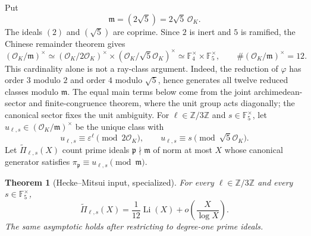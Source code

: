 \documentclass[12pt]{amsart}
\newtheorem{theorem}{Theorem}[section]
\theoremstyle{definition}
\theoremstyle{remark}
\newcommand{\ZZ}{\mathbb{Z}}
\newcommand{\FF}{\mathbb{F}}
\newcommand{\OK}{\mathcal{O}_K}
\newcommand{\eps}{\varepsilon}
\newcommand{\ph}{\varphi}
\begin{document}
Put
\[
  \mathfrak m=(2\sqrt5)=2\sqrt5\,\OK.
\]
The ideals $(2)$ and $(\sqrt5)$ are coprime.  Since $2$ is inert and
$5$ is ramified, the Chinese remainder theorem gives
\[
  (\OK/\mathfrak m)^\times
  \simeq (\OK/2\OK)^\times\times
         (\OK/\sqrt5\OK)^\times
  \simeq \FF_4^\times\times\FF_5^\times,
  \qquad
  \#(\OK/\mathfrak m)^\times=12.
\]
This cardinality alone is not a ray-class argument.  Indeed, the
reduction of $\ph$ has order $3$ modulo $2$ and order $4$ modulo
$\sqrt5$, hence generates all twelve reduced classes modulo
$\mathfrak m$.  The equal main terms below come from the joint
archimedean-sector and finite-congruence theorem, where the unit group
acts diagonally; the canonical sector fixes the unit ambiguity.
For $\ell\in\ZZ/3\ZZ$ and $s\in\FF_5^\times$, let
$u_{\ell,s}\in(\OK/\mathfrak m)^\times$ be the unique class with
\[
  u_{\ell,s}\equiv\eps^\ell\pmod{2\OK},
  \qquad
  u_{\ell,s}\equiv s\pmod{\sqrt5\OK}.
\]
Let $\widetilde\Pi_{\ell,s}(X)$ count prime ideals
$\mathfrak p\nmid\mathfrak m$ of norm at most $X$ whose canonical
generator satisfies
$\pi_{\mathfrak p}\equiv u_{\ell,s}\pmod{\mathfrak m}$.

\begin{theorem}[Hecke--Mitsui input, specialized]
\label{thm:mitsui-special}
For every $\ell\in\ZZ/3\ZZ$ and every $s\in\FF_5^\times$,
\[
  \widetilde\Pi_{\ell,s}(X)
  =\frac1{12}\operatorname{Li}(X)
   +o\!\left(\frac{X}{\log X}\right).
\]
The same asymptotic holds after restricting to degree-one prime
ideals.
\end{theorem}
\end{document}
